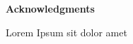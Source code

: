 \thispagestyle{plain}
\begin{center}
    \Large
    \textbf{Acknowledgments}
    

 
\end{center}
Lorem Ipsum sit dolor amet
